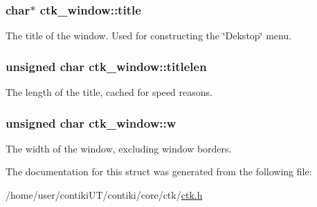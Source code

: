 \subsubsection[{title}]{\setlength{\rightskip}{0pt plus 5cm}char$\ast$ ctk\+\_\+window\+::title}\label{structctk__window_a88d87bdebfbac969714162a150325eb9}
The title of the window. Used for constructing the \char`\"{}\+Dekstop\char`\"{} menu. \hypertarget{structctk__window_a286ad62dacbe17e4a1becf8d1e2d8dc4}{}
\subsubsection[{titlelen}]{\setlength{\rightskip}{0pt plus 5cm}unsigned char ctk\+\_\+window\+::titlelen}\label{structctk__window_a286ad62dacbe17e4a1becf8d1e2d8dc4}
The length of the title, cached for speed reasons. \hypertarget{structctk__window_ae28cceb9e11fde55afc3abe1c29688b8}{}
\subsubsection[{w}]{\setlength{\rightskip}{0pt plus 5cm}unsigned char ctk\+\_\+window\+::w}\label{structctk__window_ae28cceb9e11fde55afc3abe1c29688b8}
The width of the window, excluding window borders. 

The documentation for this struct was generated from the following file\+:\begin{DoxyCompactItemize}
\item 
/home/user/contiki\+U\+T/contiki/core/ctk/\hyperlink{ctk_8h}{ctk.\+h}\end{DoxyCompactItemize}

